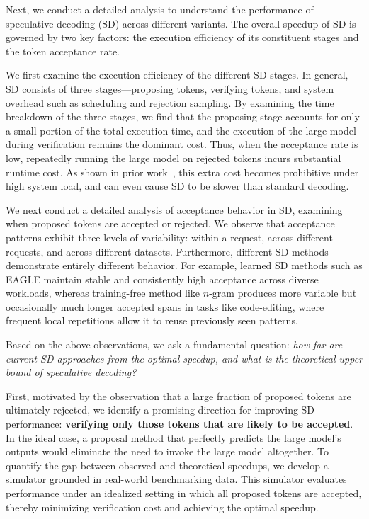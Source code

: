 \documentclass{article}
\begin{document}
Next, we conduct a detailed analysis to understand the performance of speculative decoding (SD) across different variants. The overall speedup of SD is governed by two key factors: the execution efficiency of its constituent stages and the token acceptance rate.

We first examine the execution efficiency of the different SD stages.
In general, SD consists of three stages---proposing tokens, verifying tokens, and system overhead such as scheduling and rejection sampling. 
By examining the time breakdown of the three stages, we find that the proposing stage accounts for only a small portion of the total execution time, and the execution of the large model during verification remains the dominant cost. Thus, when the acceptance rate is low, repeatedly running the large model on rejected tokens incurs substantial runtime cost. As shown in prior work~\cite{liu2024dsd}, this extra cost becomes prohibitive under high system load, and can even cause SD to be slower than standard decoding.

We next conduct a detailed analysis of acceptance behavior in SD, examining when proposed tokens are accepted or rejected.
We observe that acceptance patterns exhibit three levels of variability: within a request, across different requests, and across different datasets. 
Furthermore, different SD methods demonstrate entirely different behavior. For example, learned SD methods such as EAGLE maintain stable and consistently high acceptance across diverse workloads, whereas training-free method like $n$-gram produces more variable but occasionally much longer accepted spans in tasks like code-editing, where frequent local repetitions allow it to reuse previously seen patterns.

Based on the above observations, we ask a fundamental question: \emph{how far are current SD approaches from the optimal speedup, and what is the theoretical upper bound of speculative decoding?}

First, motivated by the observation that a large fraction of proposed tokens are ultimately rejected, we identify a promising direction for improving SD performance: \textbf{verifying only those tokens that are likely to be accepted}. In the ideal case, a proposal method that perfectly predicts the large model’s outputs would eliminate the need to invoke the large model altogether. To quantify the gap between observed and theoretical speedups, we develop a simulator grounded in real-world benchmarking data. This simulator evaluates performance under an idealized setting in which all proposed tokens are accepted, thereby minimizing verification cost and achieving the optimal speedup.
\end{document}

